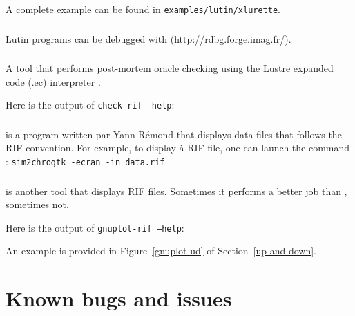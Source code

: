 A complete example can be found in {\tt examples/lutin/xlurette}.

\subsubsection{\rdbg}
Lutin programs can be debugged with \rdbg{} (\url{http://rdbg.forge.imag.fr/}).

\subsubsection{\checkrif}

A  tool that performs  post-mortem oracle  checking using  the
 Lustre expanded code (.ec) interpreter \ecexe.

Here is the output of {\tt check-rif --help}:
\begin{alltt}

\end{alltt}

\subsubsection{\simtochro}

\simtochro is  a program written par Yann  R\'emond that displays
data files that follows the  RIF convention.  For example, to display
à RIF file, one can launch the command : {\tt sim2chrogtk -ecran -in
  data.rif }

\subsubsection{\gnuplotrif}

{\gnuplotrif} is another tool that displays RIF files.  Sometimes
it performs a better job than \simtochro, sometimes not.


Here is the output of {\tt gnuplot-rif --help}:
\begin{alltt}

\end{alltt}


An    example    is    provided   in    Figure~\ref{gnuplot-ud}    of
Section~\ref{up-and-down}.




\section{Known bugs and issues}

